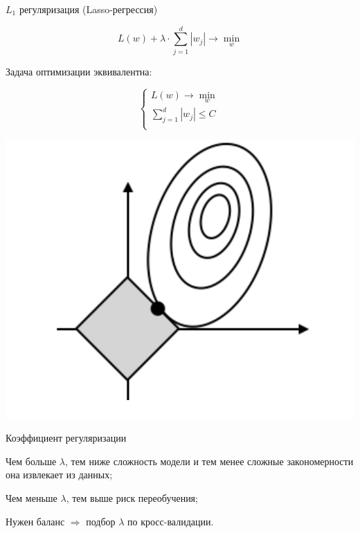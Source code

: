 \documentclass[notes,12pt, aspectratio=169]{beamer}
\newenvironment{wideitemize}{\itemize\addtolength{\itemsep}{10pt}}{\enditemize}
\begin{document}
\begin{frame}{$L_1$ регуляризация (Lasso-регрессия)}
	
	\[L(w) + \lambda \cdot  \sum_{j=1}^d |w_j|  \to \min_{w}\]
	
	Задача оптимизации эквивалентна:
	
	\[
	\begin{cases} 
		L(w) \to \min_{w} \\
		\sum_{j=1}^d  |w_j| \le C \\
	\end{cases}
	\]
	
	\begin{center}
		\includegraphics[width=0.3\paperwidth]{l1reg.png}
	\end{center}
\end{frame}


\begin{frame}{Коэффициент регуляризации}
	\begin{wideitemize}
		\item  Чем больше $\lambda$, тем ниже сложность модели и тем менее сложные закономерности она извлекает из данных;
		
		\item  Чем меньше $\lambda$, тем выше риск переобучения;
		
		\item  Нужен баланс $\Rightarrow$ подбор $\lambda$ по кросс-валидации.
		
	\end{wideitemize}
\end{frame}
\end{document}
